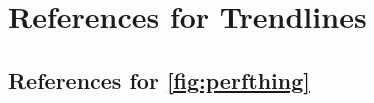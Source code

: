 \chapter{References for Trendlines}

\section{References for \autoref{fig:perfthing}}
\label{sec:refvoorgev}

